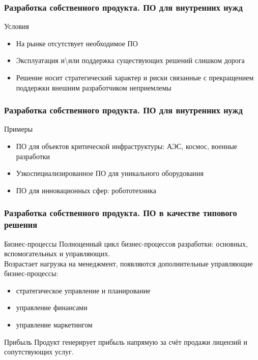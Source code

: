 \documentclass{../industrial-development}
\begin{document}
\begin{frame} \frametitle{Разработка собственного продукта. ПО для внутренних нужд}
	\begin{block}{Условия}
		\begin{itemize}
			\item На рынке отсутствует необходимое ПО
			\item Эксплуатация и\textbackslash или поддержка существующих решений слишком дорога
			\item Решение носит стратегический характер и риски связанные с прекращением поддержки внешним разработчиком неприемлемы
		\end{itemize}
	\end{block}
\end{frame}
\lecturenotes


\begin{frame} \frametitle{Разработка собственного продукта. ПО для внутренних нужд}
	\begin{block}{Примеры}
		\begin{itemize}
			\item ПО для объектов критической инфраструктуры: АЭС, космос, военные разработки
			\item Узкоспециализированное ПО для уникального оборудования
			\item ПО для инновационных сфер: робототехника
		\end{itemize}
	\end{block}
\end{frame}
\lecturenotes


\begin{frame} \frametitle{Разработка собственного продукта. ПО в качестве типового решения}
	\begin{block}{Бизнес-процессы}
		Полноценный цикл бизнес-процессов разработки: основных, вспомогательных и управляющих.\\
		Возрастает нагрузка на менеджмент, появляются дополнительные управляющие бизнес-процессы:
		\begin{itemize}
			\item стратегическое управление и планирование
			\item управление финансами
			\item управление маркетингом
		\end{itemize}
	\end{block}
	\begin{block}{Прибыль}
		Продукт генерирует прибыль напрямую за счёт продажи лицензий и сопутствующих услуг.
	\end{block}
\end{frame}
\lecturenotes
\end{document}
